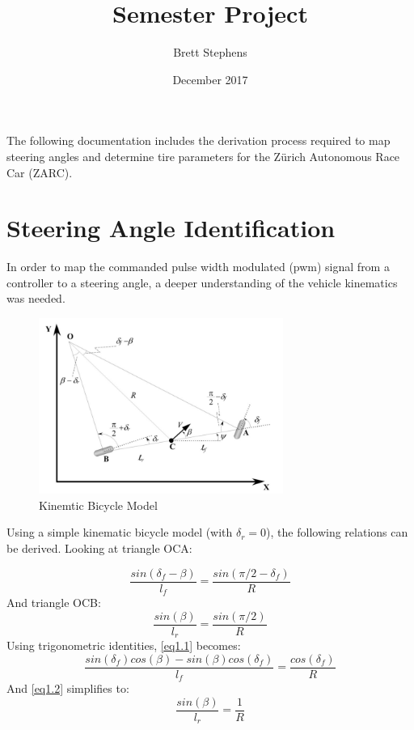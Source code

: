 \documentclass{article}
\title{Semester Project}
\author{Brett Stephens }
\date{December 2017}
\numberwithin{equation}{section}
\begin{document}
\maketitle
The following documentation includes the derivation process required to map steering angles and determine tire parameters for the Zürich Autonomous Race Car (ZARC).
\section{Steering Angle Identification}
In order to map the commanded pulse width modulated (pwm) signal from a controller to a steering angle, a deeper understanding of the vehicle kinematics was needed.   
\begin{figure}[H]
\centering
\includegraphics[width=8cm]{BicycleModel.png}
\caption{Kinemtic Bicycle Model}
\label{fig:BicycleModel}
\end{figure}
\begin{flushleft}
Using a simple kinematic bicycle model (with $\delta_r = 0$), the following relations can be derived. 
Looking at triangle OCA:
\end{flushleft}
\begin{equation} \label{eq1.1}
    \frac{sin(\delta_f - \beta)}{l_f} = \frac{sin(\pi/2 -\delta_f)}{R}
\end{equation}
And triangle OCB:
\begin{equation} \label{eq1.2}
    \frac{sin(\beta)}{l_r} = \frac{sin(\pi/2)}{R}
\end{equation}
Using trigonometric identities, \eqref{eq1.1} becomes:
\begin{equation} \label{eq1.3}
    \frac{sin(\delta_f)cos(\beta)-sin(\beta)cos(\delta_f)}{l_f} = \frac{cos(\delta_f)}{R}
\end{equation}
And \eqref{eq1.2} simplifies to:
\begin{equation}\label{eq1.4}
    \frac{sin(\beta)}{l_r} = \frac{1}{R}
\end{equation}
\end{document}

